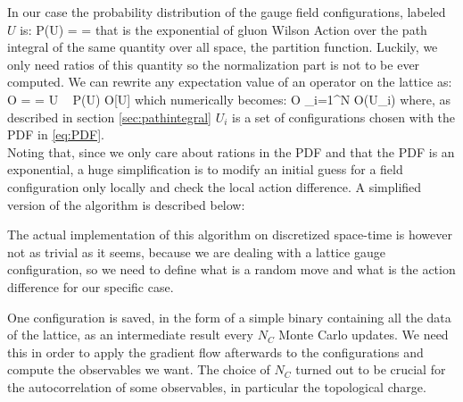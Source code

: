 In our case the probability distribution of the gauge field configurations, labeled $U$ is:
\beq
\label{eq:PDF}
    P(U) =  = 
\eeq
that is the exponential of gluon Wilson Action over the path integral of the same quantity over all space, the partition function. Luckily, we only need ratios of this quantity so the normalization part is not to be ever computed. We can rewrite any expectation value of an operator on the lattice as:
\beq
    \langle O \rangle =  = \int  \D U ~ P(U) O[U]
\eeq
which numerically becomes:
\beq
\langle O \rangle \approx {} \sum_{i=1}^N O(U_i)
\eeq
where, as described in section \cref{sec:pathintegral} $U_i$ is a set of configurations chosen with the PDF in \cref{eq:PDF}. \\
Noting that, since we only care about rations in the PDF and that the PDF is an exponential, a huge simplification is to modify an initial guess for a field configuration only locally and check the local action difference.
A simplified version of the algorithm is described below:

The actual implementation of this algorithm on discretized space-time is however not as trivial as it seems, because we are dealing with a lattice gauge configuration, so we need to define what is a random move and what is the action difference for our specific case.

One configuration is saved, in the form of a simple binary containing all the data of the lattice, as an intermediate result every $N_C$ Monte Carlo updates. We need this in order to apply the gradient flow afterwards to the configurations and compute the observables we want. The choice of $N_C$ turned out to be crucial for the autocorrelation of some observables, in particular the topological charge.

